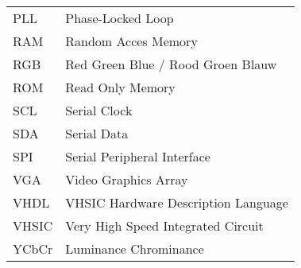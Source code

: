 \begin{flushleft}
\begin{tabularx}{\textwidth}{@{}p{12mm}X@{}}
        PLL     & Phase-Locked Loop                                     \\													
        RAM     & Random Acces Memory                                   \\													
        RGB     & Red Green Blue / Rood Groen Blauw                     \\													
        ROM     & Read Only Memory                                      \\													
        SCL     & Serial Clock                                          \\													
        SDA     & Serial Data                                           \\													
        SPI     & Serial Peripheral Interface                           \\													
        VGA     & Video Graphics Array                                  \\													
        VHDL    & VHSIC Hardware Description Language                   \\													
        VHSIC   & Very High Speed Integrated Circuit                    \\													
        YCbCr   & Luminance Chrominance                                 \\									
  \end{tabularx}
\end{flushleft}
